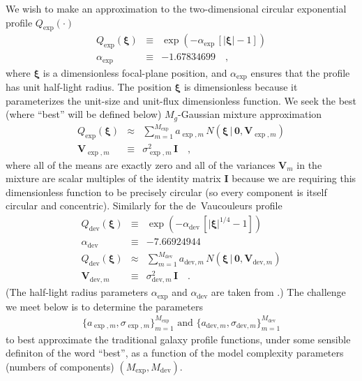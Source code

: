 \documentclass[12pt,pdftex,preprint]{aastex}
\newcommand{\tmatrix}[1]{\boldsymbol{#1}}
\newcommand{\tvector}[1]{\boldsymbol{#1}}
\newcommand{\spos}{\tvector{\xi}}
\newcommand{\var}{\tmatrix{V}\!}
\newcommand{\zero}{\tmatrix{0}}
\newcommand{\identity}{\tmatrix{I}}
\newcommand{\normal}{N}
\newcommand{\given}{\,|\,}
\newcommand{\dev}{\mathrm{dev}}
\begin{document}
We wish to make an approximation to the two-dimensional circular
exponential profile $Q_{\exp}(\cdot)$
\begin{eqnarray}\displaystyle
Q_{\exp}(\spos) &\equiv& \exp(-\alpha_{\exp}\,[|\spos| - 1])
\\
\alpha_{\exp} &\equiv& -1.67834699
\quad ,
\end{eqnarray}
where $\spos$ is a dimensionless focal-plane position, and
$\alpha_{\exp}$ ensures that the profile has unit half-light radius.
The position $\spos$ is dimensionless because it parameterizes the
unit-size and unit-flux dimensionless function.  We seek the best
(where ``best'' will be defined below) $M_g$-Gaussian mixture
approximation
\begin{eqnarray}\displaystyle
Q_{\exp}(\spos) &\approx& \sum_{m=1}^{M_{\exp}} a_{\exp,m}\,\normal(\spos\given\zero,\var_{\exp,m})
\\
\var_{\exp,m} &\equiv& \sigma^2_{\exp,m}\,\identity
\quad ,
\end{eqnarray}
where all of the means are exactly zero and all of the variances
$\var_m$ in the mixture are scalar multiples of the identity matrix
$\identity$ because we are requiring this dimensionless function to be
precisely circular (so every component is itself circular and
concentric).  Similarly for the de~Vaucouleurs profile
\begin{eqnarray}\displaystyle
Q_{\dev}(\spos) &\equiv& \exp(-\alpha_{\dev}\,[|\spos|^{1/4} - 1])
\\
\alpha_{\dev} &\equiv& -7.66924944
\\
Q_{\dev}(\spos) &\approx& \sum_{m=1}^{M_{\dev}} a_{\dev,m}\,\normal(\spos\given\zero,\var_{\dev,m})
\\
\var_{\dev,m} &\equiv& \sigma^2_{\dev,m}\,\identity
\quad .
\end{eqnarray}
(The half-light radius parameters $\alpha_{\exp}$ and $\alpha_{\dev}$
are taken from \citealt{ciotti}.)  The challenge we meet below is to
determine the parameters
\begin{eqnarray}
\{a_{\exp,m},\sigma_{\exp,m}\}_{m=1}^{M_{\exp}} \mbox{~and~} \{a_{\dev,m},\sigma_{\dev,m}\}_{m=1}^{M_{\dev}}
\end{eqnarray}
to best approximate the
traditional galaxy profile functions, under some sensible definiton of
the word ``best'', as a function of the model complexity parameters
(numbers of components) $(M_{\exp}, M_{\dev})$.
\end{document}
